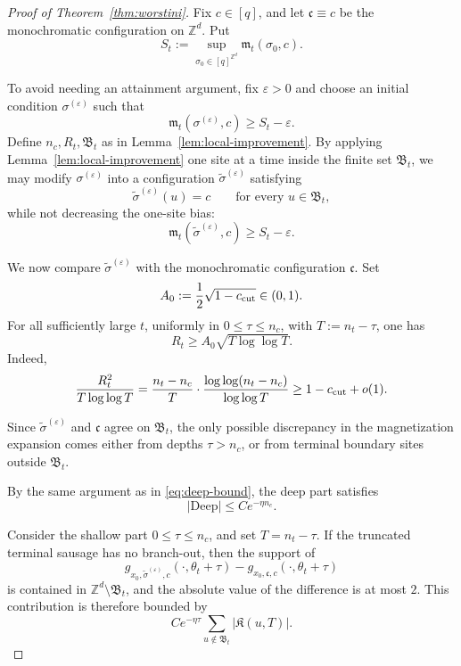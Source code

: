 \documentclass[letterpaper,11pt,reqno]{amsart}
\theoremstyle{definition}
\newcommand{\IK}{\mathfrak{K}}
\begin{document}
\begin{proof}[Proof of Theorem~\ref{thm:worstini}]
Fix \(c\in[q]\), and let \(\mathfrak c\equiv c\) be the monochromatic configuration on
\(\mathbb Z^d\). Put
\[
S_t:=\sup_{\sigma_0\in[q]^{\mathbb Z^d}}\mathfrak m_t(\sigma_0,c).
\]

To avoid needing an attainment argument, fix \(\varepsilon>0\) and choose an initial condition
\(\sigma^{(\varepsilon)}\) such that
\[
\mathfrak m_t(\sigma^{(\varepsilon)},c)\ge S_t-\varepsilon.
\]
Define \(n_c,R_t,\mathfrak B_t\) as in Lemma~\ref{lem:local-improvement}. By applying
Lemma~\ref{lem:local-improvement} one site at a time inside the finite set \(\mathfrak B_t\), we may
modify \(\sigma^{(\varepsilon)}\) into a configuration \(\widetilde\sigma^{(\varepsilon)}\) satisfying
\[
\widetilde\sigma^{(\varepsilon)}(u)=c
\qquad\text{for every }u\in\mathfrak B_t,
\]
while not decreasing the one-site bias:
\[
\mathfrak m_t(\widetilde\sigma^{(\varepsilon)},c)
\ge
S_t-\varepsilon.
\]

We now compare \(\widetilde\sigma^{(\varepsilon)}\) with the monochromatic configuration
\(\mathfrak c\). Set
\[
A_0:=\frac12\sqrt{1-c_{\rm cut}}\in(0,1).
\]
For all sufficiently large \(t\), uniformly in \(0\le\tau\le n_c\), with \(T:=n_t-\tau\), one has
\begin{equation}\label{eq:Rt-vs-T-clean}
R_t\ge A_0\sqrt{T\log\log T}.
\end{equation}
Indeed,
\[
\frac{R_t^2}{T\log\log T}
=
\frac{n_t-n_c}{T}\cdot
\frac{\log\log(n_t-n_c)}{\log\log T}
\ge
1-c_{\rm cut}+o(1).
\]

Since \(\widetilde\sigma^{(\varepsilon)}\) and \(\mathfrak c\) agree on \(\mathfrak B_t\), the only
possible discrepancy in the magnetization expansion comes either from depths \(\tau>n_c\), or from
terminal boundary sites outside \(\mathfrak B_t\).

By the same argument as in \eqref{eq:deep-bound}, the deep part satisfies
\begin{equation}\label{eq:deep-bound-worstini}
|\mathrm{Deep}|
\le
C e^{-\eta n_c}.
\end{equation}

Consider the shallow part \(0\le\tau\le n_c\), and set \(T=n_t-\tau\). If the truncated terminal
sausage has no branch-out, then the support of
\[
g_{x_0,\widetilde\sigma^{(\varepsilon)},c}(\cdot,\theta_t+\tau)
-
g_{x_0,\mathfrak c,c}(\cdot,\theta_t+\tau)
\]
is contained in \(\mathbb Z^d\setminus\mathfrak B_t\), and the absolute value of the difference is
at most \(2\). This contribution is therefore bounded by
\[
C e^{-\eta\tau}
\sum_{u\notin\mathfrak B_t}|\IK(u,T)|.
\]


\end{proof}
\end{document}
